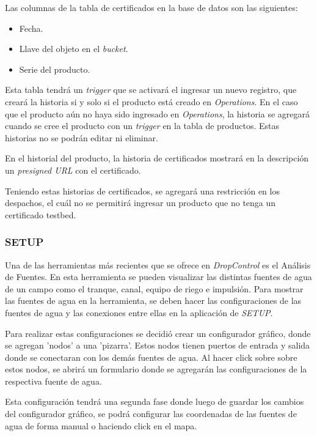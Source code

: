 Las columnas de la tabla de certificados en la base de datos son las siguientes: 
\begin{itemize}
    \item Fecha.
    \item Llave del objeto en el \textit{bucket}.
    \item Serie del producto.
\end{itemize}
Esta tabla tendrá un \textit{trigger} que se activará el ingresar un nuevo registro, que creará la historia si y solo si el producto está creado en \textit{Operations}.
En el caso que el producto aún no haya sido ingresado en \textit{Operations}, la historia se agregará cuando se cree el producto con un \textit{trigger} en la tabla de productos.
Estas historias no se podrán editar ni eliminar.

En el historial del producto, la historia de certificados mostrará en la descripción un \textit{presigned URL} con el certificado.

Teniendo estas historias de certificados, se agregará una restricción en los despachos, el cuál no se permitirá ingresar un producto que no tenga un certificado testbed.
\fi

\subsubsection{SETUP}


Una de las herramientas más recientes que se ofrece en \textit{DropControl} es el Análisis de Fuentes. En esta herramienta se pueden visualizar las distintas fuentes de agua de un campo como el tranque, canal, equipo de riego e impulsión.
Para mostrar las fuentes de agua en la herramienta, se deben hacer las configuraciones de las fuentes de agua y las conexiones entre ellas en la aplicación de \textit{SETUP}.

Para realizar estas configuraciones se decidió crear un configurador gráfico, donde se agregan 'nodos' a una 'pizarra'. Estos nodos tienen puertos de entrada y salida donde se conectaran con los demás fuentes de agua. Al hacer click sobre sobre estos nodos, se abrirá un formulario donde se agregarán las configuraciones de la respectiva fuente de agua.

Esta configuración tendrá una segunda fase donde luego de guardar los cambios del configurador gráfico, se podrá configurar las coordenadas de las fuentes de agua de forma manual o haciendo click en el mapa.

